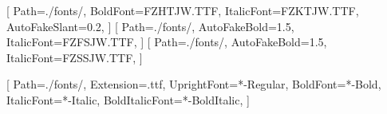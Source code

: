 
\let\oldmarginpar\marginpar
\renewcommand{\marginpar}[1]{\oldmarginpar{\footnotesize #1}}


\usepackage{fancyhdr} %
\usepackage{lastpage} %
\setlength{\headheight}{13pt} %

\makeatletter
\let\oldauthor\author
\renewcommand{\author}[1]{\oldauthor{#1}\def\myauthor{#1}}
\let\olddate\date
\renewcommand{\date}[1]{\olddate{#1}\def\mydate{#1}}
\makeatother

\pagestyle{fancy} %
\fancyhf{} %

\fancyhead[L]{\myauthor} %
\fancyhead[R]{\mydate} %

\cfoot{\thepage\ / \pageref*{LastPage}} %


\usepackage[T1]{fontenc} %
\usepackage{anyfontsize}
\usepackage{lmodern} %
\usepackage{libertine} %

[ %
    Path=./fonts/,
    BoldFont=FZHTJW.TTF, %
    ItalicFont=FZKTJW.TTF, %
    AutoFakeSlant=0.2, %
]
[ %
    Path=./fonts/,
    AutoFakeBold=1.5,  %
    ItalicFont=FZFSJW.TTF, %
]
[ %
    Path=./fonts/,
    AutoFakeBold=1.5,  %
    ItalicFont=FZSSJW.TTF, %
] 

\setmonofont{MapleMono-NF-CN}[ %
    Path=./fonts/, %
    Extension=.ttf, %
    UprightFont=*-Regular, %
    BoldFont=*-Bold, %
    ItalicFont=*-Italic, %
    BoldItalicFont=*-BoldItalic, %
]

